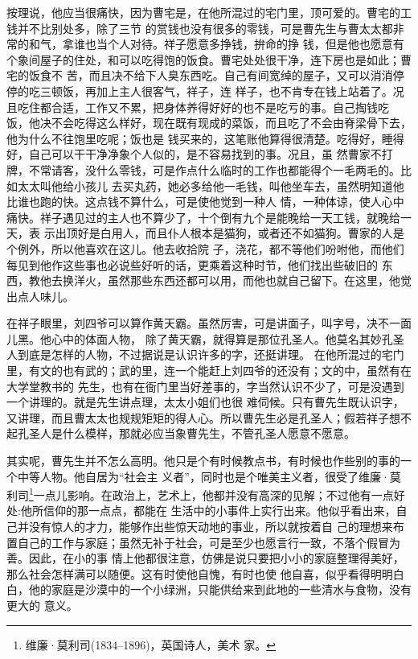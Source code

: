 \documentclass[11pt,a4paper,onecolumn]{article}
\begin{document}
按理说，他应当很痛快，因为曹宅是，在他所混过的宅门里，顶可爱的。曹宅的工钱并不比别处多，除了三节
的赏钱也没有很多的零钱，可是曹先生与曹太太都非常的和气，拿谁也当个人对待。祥子愿意多挣钱，拚命的挣
钱，但是他也愿意有个象间屋子的住处，和可以吃得饱的饭食。曹宅处处很干净，连下房也是如此；曹宅的饭食不
苦，而且决不给下人臭东西吃。自己有间宽绰的屋子，又可以消消停停的吃三顿饭，再加上主人很客气，祥子，连
样子，也不肯专在钱上站着了。况且吃住都合适，工作又不累，把身体养得好好的也不是吃亏的事。自己掏钱吃
饭，他决不会吃得这么样好，现在既有现成的菜饭，而且吃了不会由脊梁骨下去，他为什么不往饱里吃呢；饭也是
钱买来的，这笔账他算得很清楚。吃得好，睡得好，自己可以干干净净象个人似的，是不容易找到的事。况且，虽
然曹家不打牌，不常请客，没什么零钱，可是作点什么临时的工作也都能得个一毛两毛的。比如太太叫他给小孩儿
去买丸药，她必多给他一毛钱，叫他坐车去，虽然明知道他比谁也跑的快。这点钱不算什么，可是使他觉到一种人
情，一种体谅，使人心中痛快。祥子遇见过的主人也不算少了，十个倒有九个是能晚给一天工钱，就晚给一天，表
示出顶好是白用人，而且仆人根本是猫狗，或者还不如猫狗。曹家的人是个例外，所以他喜欢在这儿。他去收拾院
子，浇花，都不等他们吩咐他，而他们每见到他作这些事也必说些好听的话，更乘着这种时节，他们找出些破旧的
东西，教他去换洋火，虽然那些东西还都可以用，而他也就自己留下。在这里，他觉出点人味儿。

在祥子眼里，刘四爷可以算作黄天霸。虽然厉害，可是讲面子，叫字号，决不一面儿黑。他心中的体面人物，
除了黄天霸，就得算是那位孔圣人。他莫名其妙孔圣人到底是怎样的人物，不过据说是认识许多的字，还挺讲理。
在他所混过的宅门里，有文的也有武的；武的里，连一个能赶上刘四爷的还没有；文的中，虽然有在大学堂教书的
先生，也有在衙门里当好差事的，字当然认识不少了，可是没遇到一个讲理的。就是先生讲点理，太太小姐们也很
难伺候。只有曹先生既认识字，又讲理，而且曹太太也规规矩矩的得人心。所以曹先生必是孔圣人；假若祥子想不
起孔圣人是什么模样，那就必应当象曹先生，不管孔圣人愿意不愿意。

其实呢，曹先生并不怎么高明。他只是个有时候教点书，有时候也作些别的事的一个中等人物。他自居为``社会主
义者''，同时也是个唯美主义者，很受了维廉·莫利司\footnote{维廉·莫利司(1834--1896)，英国诗人，美术
家。}一点儿影响。在政治上，艺术上，他都并没有高深的见解；不过他有一点好处:他所信仰的那一点点，都能在
生活中的小事件上实行出来。他似乎看出来，自己并没有惊人的才力，能够作出些惊天动地的事业，所以就按着自
己的理想来布置自己的工作与家庭；虽然无补于社会，可是至少也愿言行一致，不落个假冒为善。因此，在小的事
情上他都很注意，仿佛是说只要把小小的家庭整理得美好，那么社会怎样满可以随便。这有时使他自愧，有时也使
他自喜，似乎看得明明白白，他的家庭是沙漠中的一个小绿洲，只能供给来到此地的一些清水与食物，没有更大的
意义。
\end{document}
